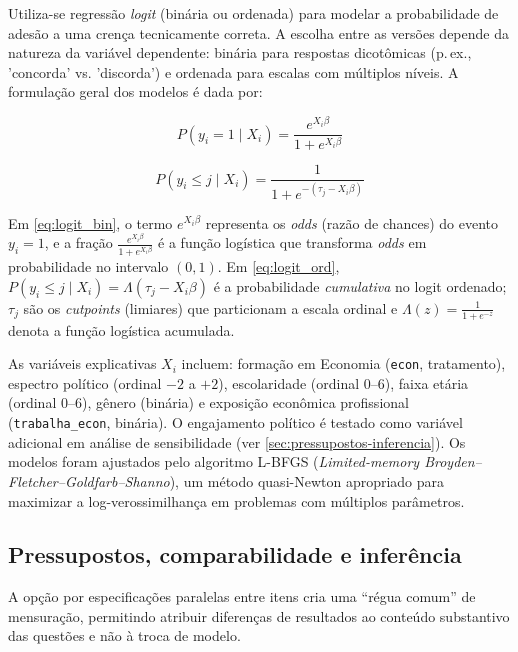 Utiliza-se regressão \textit{logit} (binária ou ordenada) para modelar a probabilidade de adesão a uma crença tecnicamente correta. A escolha entre as versões depende da natureza da variável dependente: binária para respostas dicotômicas (p.\,ex., 'concorda' vs. 'discorda') e ordenada para escalas com múltiplos níveis. A formulação geral dos modelos é dada por:

\begin{equation}\label{eq:logit_bin}
P(y_i = 1 \mid X_i) = \frac{e^{X_i \beta}}{1 + e^{X_i \beta}}
\end{equation}

\begin{equation}\label{eq:logit_ord}
P(y_i \leq j \mid X_i) = \frac{1}{1 + e^{-(\tau_j - X_i \beta)}}
\end{equation}


Em \eqref{eq:logit_bin}, o termo $e^{X_i\beta}$ representa os \textit{odds} (razão de chances) do evento $y_i=1$, e a fração $\frac{e^{X_i\beta}}{1+e^{X_i\beta}}$ é a função logística que transforma \textit{odds} em probabilidade no intervalo $(0,1)$. Em \eqref{eq:logit_ord}, $P(y_i\le j\mid X_i)=\Lambda(\tau_j - X_i\beta)$ é a probabilidade \textit{cumulativa} no logit ordenado; $\tau_j$ são os \textit{cutpoints} (limiares) que particionam a escala ordinal e $\Lambda(z)=\frac{1}{1+e^{-z}}$ denota a função logística acumulada.

As variáveis explicativas $X_i$ incluem: formação em Economia (\texttt{econ}, tratamento), espectro político (ordinal $-2$ a $+2$), escolaridade (ordinal 0–6), faixa etária (ordinal 0–6), gênero (binária) e exposição econômica profissional (\texttt{trabalha\_econ}, binária). O engajamento político é testado como variável adicional em análise de sensibilidade (ver \autoref{sec:pressupostos-inferencia}). Os modelos foram ajustados pelo algoritmo L-BFGS (\textit{Limited-memory Broyden–Fletcher–Goldfarb–Shanno}), um método quasi-Newton apropriado para maximizar a log-verossimilhança em problemas com múltiplos parâmetros.

\subsection{Pressupostos, comparabilidade e inferência}
\label{sec:pressupostos-inferencia}

A opção por especificações paralelas entre itens cria uma ``régua comum'' de mensuração, permitindo atribuir diferenças de resultados ao conteúdo substantivo das questões e não à troca de modelo.

